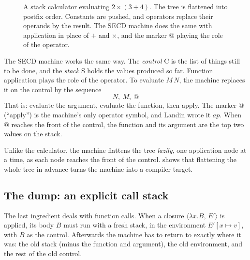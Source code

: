\documentclass[11pt,a4paper]{article}
\makeatletter
\newcommand{\ap}{\mathtt{@}}
\newcommand{\cl}[2]{\langle #1,\, #2\rangle}
\theoremstyle{definition}
\theoremstyle{plain}
\makeatother
\begin{document}
\begin{figure}[t]
\centering
{}
\caption{A stack calculator evaluating $2\times(3+4)$. The tree is flattened
into postfix order. Constants are pushed, and operators replace their operands
by the result. The SECD machine does the same with application in place of
$+$ and $\times$, and the marker $\ap$ playing the role of the operator.}
\label{fig:rpn}
\end{figure}

The SECD machine works the same way. The \emph{control} C is the list of
things still to be done, and the \emph{stack} S holds the values produced so
far. Function application plays the role of the operator. To evaluate
$M\,N$, the machine replaces it on the control by the sequence
\[
  N,\ M,\ \ap
\]
That is: evaluate the argument, evaluate the function, then apply. The
marker $\ap$ (``apply'') is the machine's only operator symbol, and Landin
wrote it $\mathit{ap}$. When $\ap$ reaches the front of the control, the
function and its argument are the top two values on the stack.

Unlike the calculator, the machine flattens the tree \emph{lazily}, one
application node at a time, as each node reaches the front of the control.
 shows that flattening the whole tree in advance turns
the machine into a compiler target.

\subsection{The dump: an explicit call stack}

The last ingredient deals with function calls. When a closure
$\cl{\lambda x.B}{E'}$ is applied, its body $B$ must run with a fresh stack, in
the environment $E'[x\mapsto v]$, with $B$ as the control. Afterwards the
machine has to return to exactly where it was: the old stack (minus the
function and argument), the old environment, and the rest of the old control.
\end{document}
